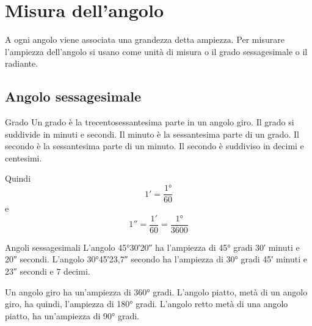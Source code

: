 \section{Misura dell'angolo}
\label{sec:MisuraAngoloGonio}

A ogni angolo viene associata una grandezza detta ampiezza. Per misurare l'ampiezza dell'angolo si usano come unità di misura o il grado sessagesimale o il radiante.
\subsection{Angolo sessagesimale}
\begin{definizionet}{Grado}{}
Un grado è la trecentosessantesima parte in un angolo giro. Il grado si suddivide in minuti e secondi. Il minuto è la sessantesima parte di un grado. Il secondo è la sessantesima parte di un minuto. Il secondo è suddiviso in decimi e centesimi.
\end{definizionet}
 Quindi \[\ang{;1;}=\dfrac{\ang{1}}{60}\] e \[\ang{;;1}=\dfrac{\ang{;1;}}{60}=\dfrac{\ang{1}}{3600}\]
\begin{esempiot}{Angoli sessagesimali}{}
L'angolo \ang{45;30;20} ha l'ampiezza di \ang{45} gradi \ang{;30;} minuti e \ang{;;20} secondi. L'angolo \ang{30;45;23,7} secondo ha l'ampiezza di \ang{30} gradi \ang{;45;} minuti e \ang{;;23} secondi e $7$ decimi.
\end{esempiot}
Un angolo giro ha un'ampiezza di \ang{360} gradi. L'angolo piatto, metà di un angolo giro, ha quindi, l'ampiezza di \ang{180} gradi. L'angolo retto metà di una angolo piatto, ha un'ampiezza di \ang{90} gradi.

